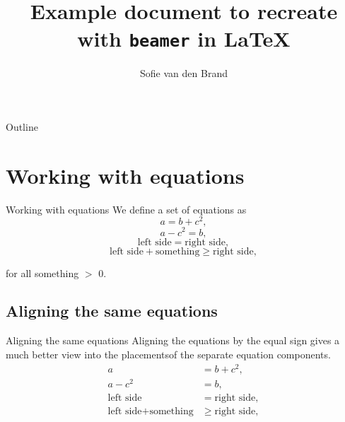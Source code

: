 \documentclass[aspectratio=169]{beamer}
\title[] {Example document to recreate with \texttt{beamer} in \LaTeX}
\author[van den Brand]{
  Sofie van den Brand }
\date{}
\begin{document}



\begin{frame}{Outline}

\tableofcontents[]
\end{frame}

\section{Working with equations}

\begin{frame}{Working with equations}
We define a set of equations as
\begin{equation}
a = b + c^2,    
\end{equation}
\begin{equation}
a - c^2 = b,    
\end{equation}
\begin{equation}
\text{left side} = \text{right side},     
\end{equation}
\begin{equation}
\text{left side} + \text{something} \ge \text{right side},    
\end{equation}

for all something $>$ 0.
\end{frame}

\subsection{Aligning the same equations}

\begin{frame}{Aligning the same equations}
Aligning the equations by the equal sign gives a much better view into the placementsof the separate equation components.
\begin{align} 
a &= b + c^2, \\ 
a - c^2 &= b, \\
\text{left side} &= \text{right side},\\
\text{left side} + \text{something} &\ge \text{right side},    
\end{align}
\end{frame}
\end{document}

